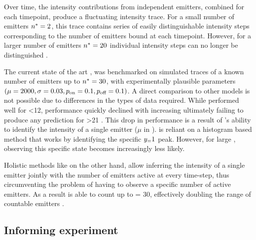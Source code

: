 %
Over time, the intensity contributions from independent emitters, combined for each timepoint, produce a fluctuating intensity trace.
	For a small number of emitters \ie $n^* = 2$, this trace contains series of easily distinguishable intensity steps corresponding to the number of emitters bound at each timepoint.
	However, for a larger number of emitters \ie $n^* = 20$ individual intensity steps can no longer be distinguished .

The current state of the art \lbfcs, was benchmarked on simulated traces of a known number of emitters up to $n^* = 30$, with experimentally plausible parameters $(\mu=2000, \sigma=0.03, p_\text{on}=0.1, p_\text{off}=0.1)$.
	A direct comparison to other models is not possible due to differences in the types of data required.
	While \lbfcs performed well for \truen \textless 12, performance quickly declined with increasing \truen ultimately failing to produce any prediction for \truen \textgreater 21 .
	This drop in performance is a result of \lbfcs’s ability to identify the intensity of a single emitter ($\mu$ in \ours). \lbfcs is reliant on a histogram based method that works by identifying the specific $y_{=}1$ peak. However, for large \truen, observing this specific state becomes increasingly less likely. 

Holistic methods like \ours on the other hand, allow inferring the intensity of a single emitter
jointly with the number of emitters active at every time-step, thus
circumventing the problem of having to observe a specific number of active emitters.
	As a result \ours is able to count up to \truen = 30, effectively doubling the range of countable emitters .



\subsection{Informing experiment}

